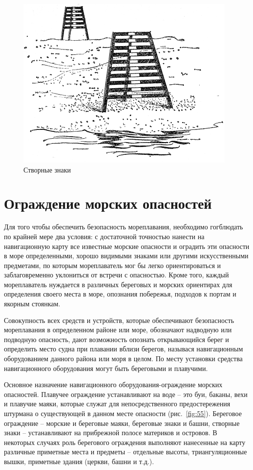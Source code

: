 \documentclass[a4paper, 12pt, twoside, final, book, russian, fittopage, cyremdash]{ncc}
\newcommand{\ris}[1]{\ref{fig:#1}}
\begin{document}
\begin{figure}[htb]
  \centering{}
  \includegraphics[scale=1.2]{0054P}
  \caption{Створные знаки}
  \label{fig:54}
\end{figure}

\section{Ограждение морских опасностей}

Для того чтобы обеспечить безопасность мореплавания, необходимо гогблюдать по крайней мере два условия: с достаточной точностью нанести на навигационную карту все известные морские опасности и оградить эти опасности в море определенными, хорошо видимыми знаками или другими искусственными предметами, по которым мореплаватель мог бы легко ориентироваться и заблаговременно уклониться от встречи с опасностью. Кроме того, каждый мореплаватель нуждается в различных береговых и морских ориентирах для определения своего места в море, опознания побережья, подходов к портам и якорным стоянкам.

Совокупность всех средств и устройств, которые обеспечивают безопасность мореплавания в определенном районе или море, обозначают надводную или подводную опасность, дают возможность опознать открывающийся берег и определить место судна при плавании вблизи берегов, называся навигационным оборудованием данного района или моря в целом. По месту установки средства навигационного оборудования могут быть береговыми и плавучими.

Основное назначение навигационного оборудования-ограждение морских опасностей. Плавучее ограждение устанавливают на воде \--- это буи, баканы, вехи и плавучие маяки, которые служат для непосредственного предостережения штурмана о существующей в данном месте опасности (рис.~\ris{55}). Береговое ограждение \--- морские и береговые маяки, береговые знаки и башни, створные знаки \--- устанавливают на прибрежной полосе материков и островов. В некоторых случаях роль берегового ограждения выполняют нанесенные на карту различные приметные места и предметы \--- отдельные высоты, триангуляционные вышки, приметные здания (церкви, башни и т.д.). 
\end{document}

